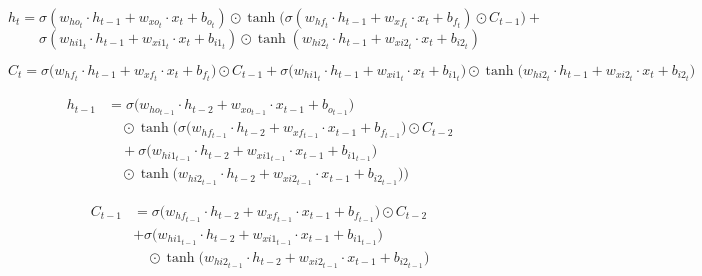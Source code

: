 \documentclass[12pt]{article}
\begin{document}
\[
h_t = \sigma(w_{ho_t} \cdot h_{t-1} + w_{xo_t} \cdot x_t + b_{o_t}) \odot \tanh\bigl( \sigma(w_{hf_t} \cdot h_{t-1} + w_{xf_t} \cdot x_t + b_{f_t}) \odot C_{t-1} \bigr) +
\]
\[
\sigma(w_{hi1_t} \cdot h_{t-1} + w_{xi1_t} \cdot x_t + b_{i1_t}) \odot \tanh(w_{hi2_t} \cdot h_{t-1} + w_{xi2_t} \cdot x_t + b_{i2_t})
\]

\begin{equation}
C_t = \sigma \bigl( w_{hf_t} \cdot h_{t-1} + w_{xf_t} \cdot x_t + b_{f_t} \bigr) \odot C_{t-1} + \sigma \bigl( w_{hi1_t} \cdot h_{t-1} + w_{xi1_t} \cdot x_t + b_{i1_t} \bigr) \odot \tanh \bigl( w_{hi2_t} \cdot h_{t-1} + w_{xi2_t} \cdot x_t + b_{i2_t} \bigr)
\end{equation}


\begin{align}
h_{t-1} &= \sigma \bigl( w_{ho_{t-1}} \cdot h_{t-2} + w_{xo_{t-1}} \cdot x_{t-1} + b_{o_{t-1}} \bigr) \nonumber \\
        &\quad \odot \tanh \Bigg(
            \sigma \bigl( w_{hf_{t-1}} \cdot h_{t-2} + w_{xf_{t-1}} \cdot x_{t-1} + b_{f_{t-1}} \bigr) \odot C_{t-2} \nonumber \\
            &\quad + \sigma \bigl( w_{hi1_{t-1}} \cdot h_{t-2} + w_{xi1_{t-1}} \cdot x_{t-1} + b_{i1_{t-1}} \bigr) \nonumber \\
            &\quad \odot \tanh \bigl( w_{hi2_{t-1}} \cdot h_{t-2} + w_{xi2_{t-1}} \cdot x_{t-1} + b_{i2_{t-1}} \bigr)
        \Bigg)
\end{align}



\begin{align}
C_{t-1} &= \sigma \bigl( w_{hf_{t-1}} \cdot h_{t-2} + w_{xf_{t-1}} \cdot x_{t-1} + b_{f_{t-1}} \bigr) \odot C_{t-2} \nonumber \\
        &+ \sigma \bigl( w_{hi1_{t-1}} \cdot h_{t-2} + w_{xi1_{t-1}} \cdot x_{t-1} + b_{i1_{t-1}} \bigr) \nonumber \\
        &\quad \odot \tanh \bigl( w_{hi2_{t-1}} \cdot h_{t-2} + w_{xi2_{t-1}} \cdot x_{t-1} + b_{i2_{t-1}} \bigr)
\end{align}
\end{document}
